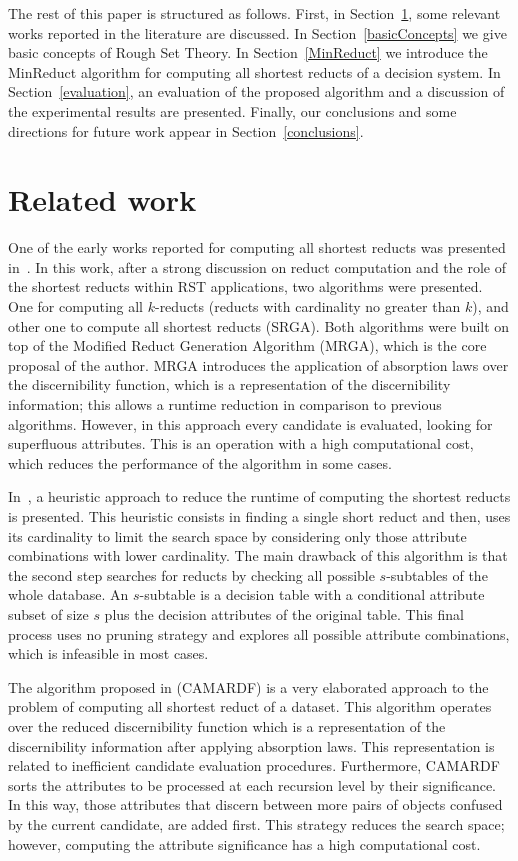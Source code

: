 \documentclass[authoryear,preprint,review,12pt]{elsarticle}
\begin{document}
  The rest of this paper is structured as follows. First, in Section~\ref{relatedWork}, some relevant works reported in the literature are discussed. In Section~\ref{basicConcepts} we give basic concepts of Rough Set Theory. In Section~\ref{MinReduct} we introduce the MinReduct algorithm for computing all shortest reducts of a decision system. In  Section~\ref{evaluation}, an evaluation of the proposed algorithm and a discussion of the experimental results are presented. Finally, our conclusions and some directions for future work appear in Section~\ref{conclusions}.
  
\section{Related work}\label{relatedWork}
  One of the early works reported for computing all shortest reducts was presented in~\citep{Susmaga}. In this work, after a strong discussion on reduct computation and the role of the shortest reducts within RST applications, two algorithms were presented. One for computing all $k$-reducts (reducts with cardinality no greater than $k$), and other one to compute all shortest reducts (SRGA). Both algorithms were built on top of the Modified Reduct Generation Algorithm (MRGA), which is the core proposal of the author. MRGA introduces the application of absorption laws over the discernibility function, which is a representation of the discernibility information; this allows a runtime reduction in comparison to previous algorithms. However, in this approach every candidate is evaluated, looking for superfluous attributes. This is an operation with a high computational cost, which reduces the performance of the algorithm in some cases.
   
  In~\citep{Lin04}, a heuristic approach to reduce the runtime of computing the shortest reducts is presented. This heuristic consists in finding a single short reduct and then, uses its cardinality to limit the search space by considering only those attribute combinations with lower cardinality. The main drawback of this algorithm is that the second step searches for reducts by checking all possible $s$-subtables of the whole database. An $s$-subtable is a decision table with a conditional attribute subset of size $s$ plus the decision attributes of the original table. This final process uses no pruning strategy and explores all possible attribute combinations, which is infeasible in most cases.
   
  The algorithm proposed in \citep{Zhou2009} (CAMARDF) is a very elaborated approach to the problem of computing all shortest reduct of a dataset. This algorithm operates over the reduced discernibility function which is a representation of the discernibility information after applying absorption laws. This representation is related to inefficient candidate evaluation procedures. Furthermore, CAMARDF sorts the attributes to be processed at each recursion level by their significance. In this way, those attributes that discern between more pairs of objects confused by the current candidate, are added first. This strategy reduces the search space; however, computing the attribute significance has a high computational cost.
   
\end{document}
